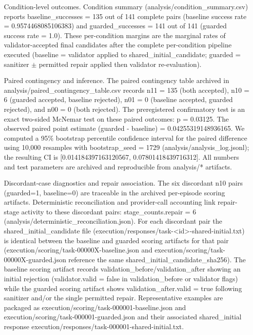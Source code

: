 \documentclass[conference]{IEEEtran}
\begin{document}
Condition-level outcomes. Condition summary (analysis/condition\_summary.csv) reports baseline\_successes = 135 out of 141 complete pairs (baseline success rate = 0.9574468085106383) and guarded\_successes = 141 out of 141 (guarded success rate = 1.0). These per-condition margins are the marginal rates of validator-accepted final candidates after the complete per-condition pipeline executed (baseline = validator applied to shared\_initial\_candidate; guarded = sanitizer \ensuremath{\pm} permitted repair applied then validator re-evaluation).

Paired contingency and inference. The paired contingency table archived in analysis/paired\_contingency\_table.csv records n11 = 135 (both accepted), n10 = 6 (guarded accepted, baseline rejected), n01 = 0 (baseline accepted, guarded rejected), and n00 = 0 (both rejected). The preregistered confirmatory test is an exact two-sided McNemar test on these paired outcomes: p = 0.03125. The observed paired point estimate (guarded - baseline) = 0.04255319148936165. We computed a 95\% bootstrap percentile confidence interval for the paired difference using 10,000 resamples with bootstrap\_seed = 1729 (analysis/analysis\_log.jsonl); the resulting CI is [0.014184397163120567, 0.07801418439716312]. All numbers and test parameters are archived and reproducible from analysis/* artifacts.

Discordant-case diagnostics and repair association. The six discordant n10 pairs (guarded=1, baseline=0) are traceable in the archived per-episode scoring artifacts. Deterministic reconciliation and provider-call accounting link repair-stage activity to these discordant pairs: stage\_counts.repair = 6 (analysis/deterministic\_reconciliation.json). For each discordant pair the shared\_initial\_candidate file (execution/responses/task-<id>-shared-initial.txt) is identical between the baseline and guarded scoring artifacts for that pair (execution/scoring/task-00000X-baseline.json and execution/scoring/task-00000X-guarded.json reference the same shared\_initial\_candidate\_sha256). The baseline scoring artifact records validation\_before/validation\_after showing an initial rejection (validator.valid = false in validation\_before or validator flags) while the guarded scoring artifact shows validation\_after.valid = true following sanitizer and/or the single permitted repair. Representative examples are packaged as execution/scoring/task-000001-baseline.json and execution/scoring/task-000001-guarded.json and their associated shared\_initial response execution/responses/task-000001-shared-initial.txt.
\end{document}
